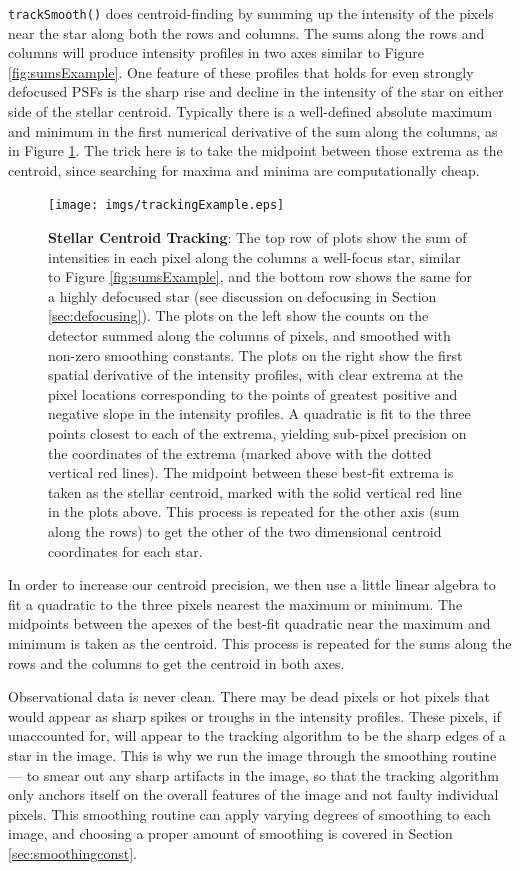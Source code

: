 \documentclass[a4paper]{article}
\newcommand{\code}[1]{\texttt{#1}}
\begin{document}
\code{trackSmooth()} does centroid-finding by summing up the intensity of the pixels near the star along both the rows and columns. The sums along the rows and columns will produce intensity profiles in two axes similar to Figure \ref{fig:sumsExample}. One feature of these profiles that holds for even strongly defocused PSFs is the sharp rise and decline in the intensity of the star on either side of the stellar centroid. Typically there is a well-defined absolute maximum and minimum in the first numerical derivative of the sum along the columns, as in Figure \ref{fig:sumRowsAndCols}. The trick here is to take the midpoint between those extrema as the centroid, since searching for maxima and minima are computationally cheap. 
\begin{figure}[H]
\begin{center}
\texttt{[image: imgs/trackingExample.eps]}
\caption{\textbf{Stellar Centroid Tracking}: The top row of plots show the sum of intensities in each pixel along the columns a well-focus star, similar to Figure \ref{fig:sumsExample}, and the bottom row shows the same for a highly defocused star (see discussion on defocusing in Section \ref{sec:defocusing}). The plots on the left show the counts on the detector summed along the columns of pixels, and smoothed with non-zero smoothing constants. The plots on the right show the first spatial derivative of the intensity profiles, with clear extrema at the pixel locations corresponding to the points of greatest positive and negative slope in the intensity profiles. A quadratic is fit to the three points closest to each of the extrema, yielding sub-pixel precision on the coordinates of the extrema (marked above with the dotted vertical red lines). The midpoint between these best-fit extrema is taken as the stellar centroid, marked with the solid vertical red line in the plots above. This process is repeated for the other axis (sum along the rows) to get the other of the two dimensional centroid coordinates for each star.}
\label{fig:sumRowsAndCols}
\end{center}	
\end{figure}
In order to increase our centroid precision, we then use a little linear algebra to fit a quadratic to the three pixels nearest the maximum or minimum. The midpoints between the apexes of the best-fit quadratic near the maximum and minimum is taken as the centroid. This process is repeated for the sums along the rows and the columns to get the centroid in both axes. 

Observational data is never clean. There may be dead pixels or hot pixels that would appear as sharp spikes or troughs in the intensity profiles. These pixels, if unaccounted for, will appear to the tracking algorithm to be the sharp edges of a star in the image. This is why we run the image through the smoothing routine --- to smear out any sharp artifacts in the image, so that the tracking algorithm only anchors itself on the overall features of the image and not faulty individual pixels. This smoothing routine can apply varying degrees of smoothing to each image, and choosing a proper amount of smoothing is covered in Section \ref{sec:smoothingconst}. 
\end{document}
